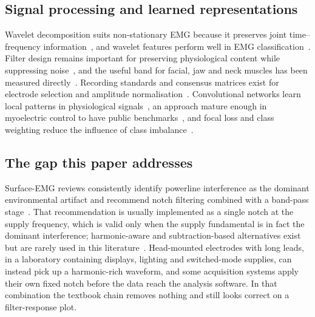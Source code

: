 \documentclass[pdflatex,sn-nature,iicol]{sn-jnl}
\begin{document}
\subsection{Signal processing and learned representations}

Wavelet decomposition suits non-stationary EMG because it preserves joint time--frequency information~\cite{mallat1989theory,daubechies1992ten,englehart2003robust}, and wavelet features perform well in EMG classification~\cite{phinyomark2012feature,bharathi2025unveiling}. Filter design remains important for preserving physiological content while suppressing noise~\cite{chowdhury2013surface,deluca2010filtering,clancy2002sampling,merletti2020tutorial,boyer2023reducing}, and the useful band for facial, jaw and neck muscles has been measured directly~\cite{vanboxtel2001optimal}. Recording standards and consensus matrices exist for electrode selection and amplitude normalisation~\cite{isek1999standards,hermens2000development,besomi2019consensus,besomi2020consensus,merletti2019tutorial,deluca1997use}. Convolutional networks learn local patterns in physiological signals~\cite{faust2018deep,craik2019deep,tsinganos2019improved,rim2020deep,kiranyaz20211d,ismailfawaz2019deep}, an approach mature enough in myoelectric control to have public benchmarks~\cite{atzori2014electromyography,atzori2016deep,coteallard2019deep,jiang2012myoelectric,phinyomark2018emg,wei2019multistream}, and focal loss and class weighting reduce the influence of class imbalance~\cite{lin2017focal,johnson2019survey}.

\subsection{The gap this paper addresses}

Surface-EMG reviews consistently identify powerline interference as the dominant environmental artifact and recommend notch filtering combined with a band-pass stage~\cite{chowdhury2013surface,raez2006techniques}. That recommendation is usually implemented as a single notch at the supply frequency, which is valid only when the supply fundamental is in fact the dominant interference; harmonic-aware and subtraction-based alternatives exist but are rarely used in this literature~\cite{mewett2004reducing,levkov2005removal,keshtkaran2014fast,sornmo2005bioelectrical}. Head-mounted electrodes with long leads, in a laboratory containing displays, lighting and switched-mode supplies, can instead pick up a harmonic-rich waveform, and some acquisition systems apply their own fixed notch before the data reach the analysis software. In that combination the textbook chain removes nothing and still looks correct on a filter-response plot.
\end{document}
